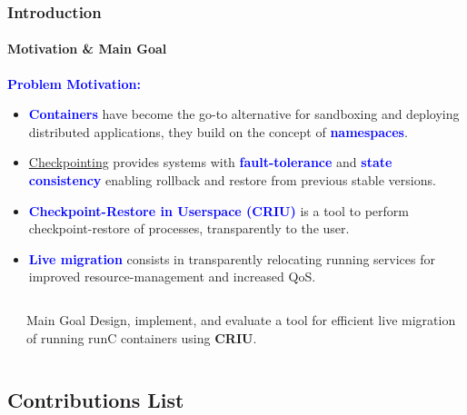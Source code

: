 \documentclass[9pt,    %
    english,            %
    xcolor=table,       %
    envcountsect,        %
    aspectratio=169     %
]{beamer}
\begin{document}
\begin{frame}
    \frametitle{Introduction}
    \framesubtitle{Motivation \& Main Goal}

    \textbf{\textcolor{blue}{Problem Motivation:}}
    \begin{itemize}
        \item \textbf{\textcolor{blue}{Containers}} have become the go-to alternative for sandboxing and deploying distributed applications, they build on the concept of \textbf{\textcolor{blue}{namespaces}}.
        \item \href{https://en.wikipedia.org/wiki/Application_checkpointing}{Checkpointing} provides systems with \textbf{\textcolor{blue}{fault-tolerance}} and \textbf{\textcolor{blue}{state consistency}} enabling rollback and restore from previous stable versions.
        \item \textbf{\textcolor{blue}{Checkpoint-Restore in Userspace (CRIU)}} is a tool to perform checkpoint-restore of processes, transparently to the user.
        \item \textbf{\textcolor{blue}{Live migration}} consists in transparently relocating running services for improved resource-management and increased QoS.
    \end{itemize}

    \begin{columns}
        \begin{column}{.1\textwidth}
        \end{column}\hspace{-5cm}
        \begin{column}{.7\textwidth}
            \begin{alertblock}{Main Goal}
                Design, implement, and evaluate a tool for efficient live migration of running runC containers using \textbf{CRIU}.
            \end{alertblock}\hfill
        \end{column}
    \end{columns}

\end{frame}

\subsection{Contributions List}
\end{document}
